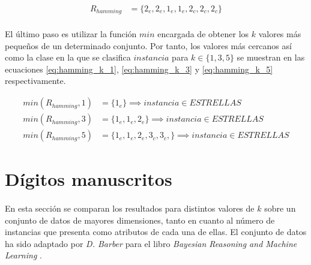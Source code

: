 \documentclass{article}
\begin{document}
			\begin{align}
			\label{eq:hamming_distance_results}
				R_{hamming} &= \{2_e, 2_e, 1_e, 1_e, 2_c, 2_c, 2_c\}
			\end{align}

			\paragraph{}
			El último paso es utilizar la función $min$ encargada de obtener los $k$ valores más pequeños de un determinado conjunto. Por tanto, los valores más cercanos así como la clase en la que se clasifica $instancia$ para $k \in \{1,3,5\}$ se muestran en las ecuaciones \eqref{eq:hamming_k_1}, \eqref{eq:hamming_k_3} y \eqref{eq:hamming_k_5} respectivamente.

			\begin{align}
			\label{eq:hamming_k_1}
				min(R_{hamming},1) &= \{ 1_e \}  \implies instancia \in ESTRELLAS \\
			\label{eq:hamming_k_3}
				min(R_{hamming},3) &= \{ 1_e, 1_e, 2_e\}  \implies instancia \in ESTRELLAS \\
			\label{eq:hamming_k_5}
				min(R_{hamming},5) &= \{ 1_e, 1_e, 2_e, 3_c, 3_c, \}  \implies instancia \in ESTRELLAS
			\end{align}

	\section{Dígitos manuscritos}
	\label{sec:e2}

		\paragraph{}
		En esta sección se comparan los resultados para distintos valores de $k$ sobre un conjunto de datos de mayores dimensiones, tanto en cuanto al número de instancias que presenta como atributos de cada una de ellas. El conjunto de datos ha sido adaptado por \emph{D. Barber} para el libro \emph{Bayesian Reasoning and Machine Learning} \cite{barberBRML2012}.
\end{document}
